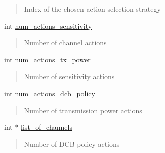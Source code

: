 \begin{DoxyCompactItemize}
\begin{DoxyCompactList}
\begin{quote}
Index of the chosen action-\/selection strategy \end{quote}
\end{DoxyCompactList}\item 
\mbox{\label{classPreProcessor_a193258f74ceca3cb13792b3c2f6cd02b}} 
int \hyperlink{classPreProcessor_a193258f74ceca3cb13792b3c2f6cd02b}{num\+\_\+actions\+\_\+sensitivity}
\begin{DoxyCompactList}\small\item\em \begin{quote}
Number of channel actions \end{quote}
\end{DoxyCompactList}\item 
\mbox{\label{classPreProcessor_a70a572176b774eddc9604a2b6599fd18}} 
int \hyperlink{classPreProcessor_a70a572176b774eddc9604a2b6599fd18}{num\+\_\+actions\+\_\+tx\+\_\+power}
\begin{DoxyCompactList}\small\item\em \begin{quote}
Number of sensitivity actions \end{quote}
\end{DoxyCompactList}\item 
\mbox{\label{classPreProcessor_a3db20d3f3df95ea17ee8eecee86cbc8a}} 
int \hyperlink{classPreProcessor_a3db20d3f3df95ea17ee8eecee86cbc8a}{num\+\_\+actions\+\_\+dcb\+\_\+policy}
\begin{DoxyCompactList}\small\item\em \begin{quote}
Number of transmission power actions \end{quote}
\end{DoxyCompactList}\item 
\mbox{\label{classPreProcessor_aa3e9a7d8a29645341f4cf0eda7e2e476}} 
int $\ast$ \hyperlink{classPreProcessor_aa3e9a7d8a29645341f4cf0eda7e2e476}{list\+\_\+of\+\_\+channels}
\begin{DoxyCompactList}\small\item\em \begin{quote}
Number of D\+CB policy actions \end{quote}
\end{DoxyCompactList}\item 

\end{DoxyCompactItemize}
